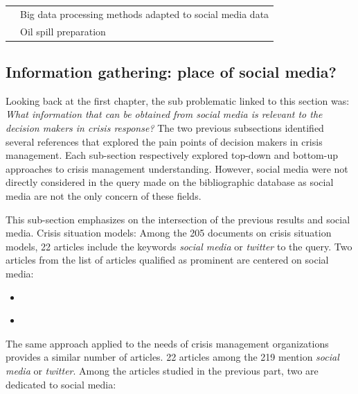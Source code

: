 \begin{table}[bp]
\begin{tabular}{m{} m{}}
        \cite{cobbDesigningDelugeUnderstanding2014}                 & Big data processing methods adapted to social media data                                                                                                                                                              \\
        \cite{cabreraaguileraModellingPerformanceVariabilities2016} & Oil spill preparation                                                                                                                                                                                                 \\
        \bottomrule
    \end{tabular}
    \label{table:business-needs-main-articles}
\end{table}

\subsection{Information gathering: place of social media?}
Looking back at the first chapter, the sub problematic linked to this section was: \emph{What information that can be obtained from social media is relevant to the decision makers in crisis response?}
The two previous subsections identified several references that explored the pain points of decision makers in crisis management.
Each sub-section respectively explored top-down and bottom-up approaches to crisis management understanding.
However, social media were not directly considered in the query made on the bibliographic database as social media are not the only concern of these fields.

This sub-section emphasizes on the intersection of the previous results and social media.
Crisis situation models:
Among the 205 documents on crisis situation models, 22 articles include the keywords \emph{social media} or \emph{twitter} to the query.
Two articles from the list of articles qualified as prominent are centered on social media:

\begin{itemize}
    \item \textcite{purohitIdentifyingSeekersSuppliers2014}
    \item \textcite{ghahremanlouGeotaggingTwitterMessages2014}
\end{itemize}

The same approach applied to the needs of crisis management organizations provides a similar number of articles.
22 articles among the 219 mention \emph{social media} or \emph{twitter}.
Among the articles studied in the previous part, two are dedicated to social media:

